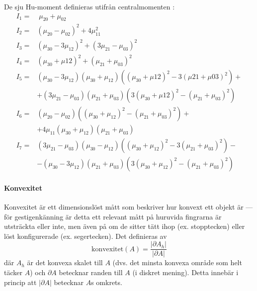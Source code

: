 \documentclass[../rapport_MVEX01-11-05]{subfiles}
\begin{document}
De sju Hu-moment definieras utifrån centralmomenten \cite[s.~185]{Hu62}:
\begin{align*}
	I_1 =& \;\mu_{20} + \mu_{02}\\
	I_2 =& \left(\mu_{20} - \mu_{02}\right)^2 + 4\mu^2_{11}\\
	I_3 =& \left(\mu_{30} - 3\mu_{12}\right)^2 +
	       \left(3\mu_{21} - \mu_{03}\right)^2\\
	I_4 =& \left(\mu_{30} + \mu{12}\right)^2 +
 	       \left(\mu_{21} + \mu_{03}\right)^2\\
	I_5 =& \left(\mu_{30} - 3\mu_{12}\right)
	       \left(\mu_{30} + \mu_{12}\right)
	       \left(\left(\mu_{30}+\mu{12}\right)^2 -
	       3\left(\mu{21}+\mu{03}\right)^2\right) + \\
 	    &+ \left(3\mu_{21} - \mu_{03}\right)\left(\mu_{21} + \mu_{03}\right)
	       \left(3\left(\mu_{30} + \mu{12}\right)^2 -
	       \left(\mu_{21} + \mu_{03}\right)^2\right)\\
	I_6 =& \left(\mu_{20}-\mu_{02}\right)
	       \left(\left(\mu_{30}+\mu_{12}\right)^2 -
	       \left(\mu_{21}+\mu_{03}\right)^2\right) + \\
	    &+ 4\mu_{11}\left(\mu_{30}+\mu_{12}\right)
	       \left(\mu_{21}+\mu_{03}\right)\\
	I_7 =& \left(3\mu_{21}-\mu_{03}\right)\left(\mu_{30}-\mu_{12}\right)
	       \left(\left(\mu_{30}+\mu_{12}\right)^2 - 
	       3\left(\mu_{21}+\mu_{03}\right)^2\right) - \\
	    &- \left(\mu_{30} - 3\mu_{12}\right)\left(\mu_{21}+\mu_{03}\right)
	       \left(3\left(\mu_{30}+\mu_{12}\right)^2 - 
  	     \left(\mu_{21}+\mu_{03}\right)^2\right)
\end{align*}



\paragraph{Konvexitet}

Konvexitet \cite[s.~26]{Rudemo09} är ett dimensionslöst
mått som beskriver hur konvext ett objekt är --- för
gestigenkänning är detta ett relevant mått på huruvida fingrarna är
utsträckta eller inte, men även på om de sitter tätt ihop (ex.
stopptecken) eller löst konfigurerade (ex. segertecken). Det
definieras av
\begin{equation*}
  \textrm{konvexitet}(A) = \frac{\left|\partial A_h\right|}{\left|\partial A\right|}
\end{equation*}
där $A_h$ är det konvexa skalet till $A$ (dvs. det minsta konvexa område som
helt täcker $A$) och $\partial A$ betecknar randen till $A$ (i diskret
mening). Detta innebär i princip att $\left|\partial A\right|$ betecknar
$A$s omkrets.
\end{document}
